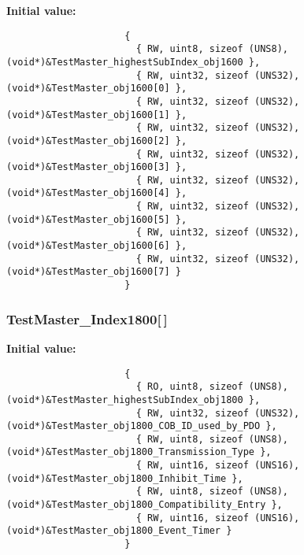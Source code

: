 \textbf{Initial value:}

\begin{Code}\begin{verbatim} 
                     {
                       { RW, uint8, sizeof (UNS8), (void*)&TestMaster_highestSubIndex_obj1600 },
                       { RW, uint32, sizeof (UNS32), (void*)&TestMaster_obj1600[0] },
                       { RW, uint32, sizeof (UNS32), (void*)&TestMaster_obj1600[1] },
                       { RW, uint32, sizeof (UNS32), (void*)&TestMaster_obj1600[2] },
                       { RW, uint32, sizeof (UNS32), (void*)&TestMaster_obj1600[3] },
                       { RW, uint32, sizeof (UNS32), (void*)&TestMaster_obj1600[4] },
                       { RW, uint32, sizeof (UNS32), (void*)&TestMaster_obj1600[5] },
                       { RW, uint32, sizeof (UNS32), (void*)&TestMaster_obj1600[6] },
                       { RW, uint32, sizeof (UNS32), (void*)&TestMaster_obj1600[7] }
                     }
\end{verbatim}\end{Code}
\subsubsection{ {\bf Test\-Master\_\-Index1800}[$\,$]}\label{TestMasterMicroMod_2TestMaster_8c_93352d9f4761dd05abb46a6a65b8282e}


\textbf{Initial value:}

\begin{Code}\begin{verbatim} 
                     {
                       { RO, uint8, sizeof (UNS8), (void*)&TestMaster_highestSubIndex_obj1800 },
                       { RW, uint32, sizeof (UNS32), (void*)&TestMaster_obj1800_COB_ID_used_by_PDO },
                       { RW, uint8, sizeof (UNS8), (void*)&TestMaster_obj1800_Transmission_Type },
                       { RW, uint16, sizeof (UNS16), (void*)&TestMaster_obj1800_Inhibit_Time },
                       { RW, uint8, sizeof (UNS8), (void*)&TestMaster_obj1800_Compatibility_Entry },
                       { RW, uint16, sizeof (UNS16), (void*)&TestMaster_obj1800_Event_Timer }
                     }
\end{verbatim}\end{Code}
